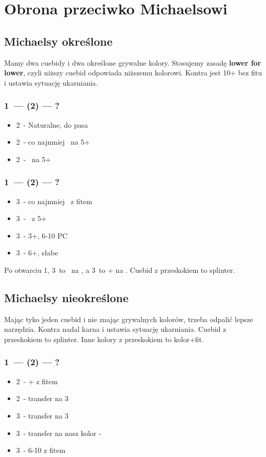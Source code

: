 \documentclass[12pt, a4paper]{article}
\begin{document}
\pagebreak
\section{Obrona przeciwko Michaelsowi}

\subsection{Michaelsy określone}
Mamy dwa cuebidy i dwa określone grywalne kolory. Stosujemy zasadę \textbf{lower for lower},
czyli niższy cuebid odpowiada niższemu kolorowi. Kontra jest 10+ bez fitu i ustawia sytuację ukarniania.

\subsubsection{1\clubs\ --- (2\clubs) --- ?}
\begin{itemize}
    \item 2\diams\ - Naturalne, do pasa
    \item 2\hearts\ - co najmniej \inv\ na 5+\clubs
    \item 2\spades\ - \gf\ na 5+\diams
\end{itemize}

\subsubsection{1\hearts\ --- (2\ntx) --- ?}
\begin{itemize}
    \item 3\clubs\ - co najmniej \inv\ z fitem \hearts
    \item 3\diams\ - \gf\ z 5+\spades
    \item 3\hearts\ - 3+\hearts, 6-10 PC
    \item 3\spades\ - 6+\spades, słabe
\end{itemize}
Po otwarciu 1\spades, 3\clubs\ to \gf\ na \hearts, a 3\diams\ to \inv+ na \spades.
Cuebid z przeskokiem to splinter.

\subsection{Michaelsy nieokreślone}
Mając tyko jeden cuebid i nie znając grywalnych kolorów, trzeba odpalić lepsze narzędzia.
Kontra nadal karna i ustawia sytuację ukarniania.
Cuebid z przeskokiem to splinter.
Inne kolory z przeskokiem to kolor+fit.
\subsubsection{1\hearts\ --- (2\hearts) --- ?}
\begin{itemize}
    \item 2\spades\ - \inv+ z fitem \hearts
    \item 2\nt\ - transfer na 3\clubs
    \item 3\clubs\ - transfer na 3\diams
    \item 3\diams\ - transfer na nasz kolor - \mixed
    \item 3\hearts\ - 6-10 z fitem \hearts
\end{itemize}
\end{document}
